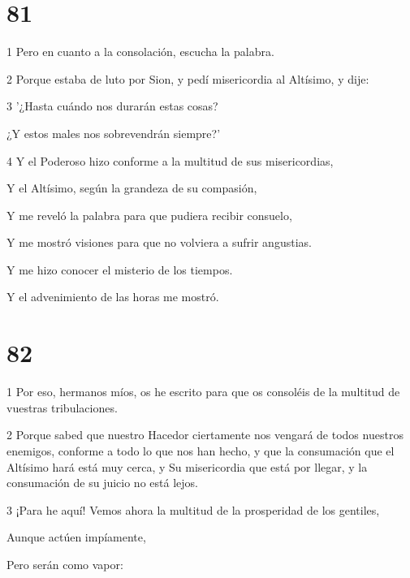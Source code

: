 \chapter{81}

\par 1 Pero en cuanto a la consolación, escucha la palabra.

\par 2 Porque estaba de luto por Sion, y pedí misericordia al Altísimo, y dije:

\par 3 '¿Hasta cuándo nos durarán estas cosas?

\par ¿Y estos males nos sobrevendrán siempre?'

\par 4 Y el Poderoso hizo conforme a la multitud de sus misericordias,

Y el Altísimo, según la grandeza de su compasión,

Y me reveló la palabra para que pudiera recibir consuelo,

Y me mostró visiones para que no volviera a sufrir angustias.

\par Y me hizo conocer el misterio de los tiempos.

\par Y el advenimiento de las horas me mostró.

\chapter{82}

\par 1 Por eso, hermanos míos, os he escrito para que os consoléis de la multitud de vuestras tribulaciones.

\par 2 Porque sabed que nuestro Hacedor ciertamente nos vengará de todos nuestros enemigos, conforme a todo lo que nos han hecho, y que la consumación que el Altísimo hará está muy cerca, y Su misericordia que está por llegar, y la consumación de su juicio no está lejos.

\par 3 ¡Para he aquí! Vemos ahora la multitud de la prosperidad de los gentiles,

\par Aunque actúen impíamente,

\par Pero serán como vapor:

